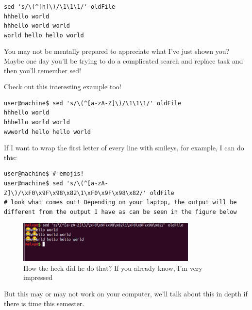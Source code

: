 \documentclass[10pt]{article}
\begin{document}
\begin{lstlisting}
sed 's/\(^[h]\)/\1\1\1/' oldFile
hhhello world
hhhello world world
world hello hello world
\end{lstlisting}

You may not be mentally prepared to appreciate what I've just shown you? Maybe one day you'll be trying to do a complicated search and replace task and then you'll remember sed!

Check out this interesting example too!

\begin{lstlisting}
user@machine$ sed 's/\(^[a-zA-Z]\)/\1\1\1/' oldFile
hhhello world
hhhello world world
wwworld hello hello world
\end{lstlisting}

If I want to wrap the first letter of every line with smileys, for example, I can do this:

\begin{lstlisting}
user@machine$ # emojis!
user@machine$ sed 's/\(^[a-zA-Z]\)/\xF0\x9F\x98\x82\1\xF0\x9F\x98\x82/' oldFile
# look what comes out! Depending on your laptop, the output will be different from the output I have as can be seen in the figure below
\end{lstlisting}


\begin{figure}[h]
  \centering
    \includegraphics[width=0.8\textwidth]{mayOrMayNotWorkForYou.png}
  \caption{How the heck did he do that? If you already know, I'm very impressed}
\end{figure}




But this may or may not work on your computer, we'll talk about this in depth if there is time this semester.
\end{document}
